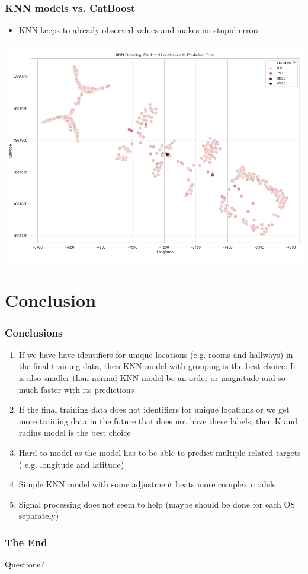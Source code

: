 \documentclass[10pt]{beamer}
\begin{document}
\begin{frame}
\frametitle{KNN models vs. CatBoost}

\begin{itemize}
    \item KNN keeps to already observed values and makes no stupid errors
\end{itemize}

\includegraphics[width=\textwidth,height=\textheight,keepaspectratio]{knn_grouping_error_of_predicted_locations.png}

\end{frame}

\section{Conclusion}

\begin{frame}
\frametitle{Conclusions}

\begin{enumerate}
    \item If we have have identifiers for unique locations (e.g. rooms and hallways) in the final
    training data, then KNN model with grouping is the best choice. It is also smaller than normal KNN
    model be an order or magnitude and so much faster with its predictions
    \item If the final training data does not identifiers for unique locations or we get more
    training data in the future that does not have these labels, then K and radius model is the best
    choice
    \item Hard to model as the model has to be able to predict multiple related targets (
        e.g. longitude and latitude)
    \item Simple KNN model with some adjustment beats more complex models
    \item Signal processing does not seem to help (maybe should be done for each OS separately)
\end{enumerate}

\end{frame}

\begin{frame}
\frametitle{The End}

\LARGE{\centerline{Questions?}}

\end{frame}

\end{document}
